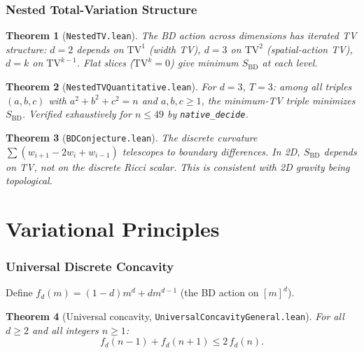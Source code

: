 \documentclass[11pt,a4paper]{article}
\newtheorem{theorem}{Theorem}[section]
\theoremstyle{remark}
\begin{document}
\section{Nested Total-Variation Structure}

\begin{theorem}[\texttt{NestedTV.lean}]
The BD action across dimensions has iterated TV structure:
$d = 2$ depends on $\mathrm{TV}^1$ (width TV),
$d = 3$ on $\mathrm{TV}^2$ (spatial-action TV),
$d = k$ on $\mathrm{TV}^{k-1}$.
Flat slices ($\mathrm{TV}^k = 0$) give minimum $S_{\mathrm{BD}}$ at each level.
\end{theorem}

\begin{theorem}[\texttt{NestedTVQuantitative.lean}]
For $d = 3$, $T = 3$: among all triples $(a,b,c)$ with $a^2+b^2+c^2 = n$
and $a,b,c \geq 1$, the minimum-TV triple minimizes $S_{\mathrm{BD}}$.
Verified exhaustively for $n \leq 49$ by \texttt{native\_decide}.
\end{theorem}

\begin{theorem}[\texttt{BDConjecture.lean}]
The discrete curvature $\sum(w_{i+1} - 2w_i + w_{i-1})$ telescopes to
boundary differences. In 2D, $S_{\mathrm{BD}}$ depends on TV, not on the
discrete Ricci scalar. This is consistent with 2D gravity being topological.
\end{theorem}

\part{Variational Principles}

\section{Universal Discrete Concavity}\label{sec:concavity}

Define $f_d(m) = (1{-}d)m^d + dm^{d-1}$ (the BD action on $[m]^d$).

\begin{theorem}[Universal concavity, \texttt{UniversalConcavityGeneral.lean}]
\label{thm:concavity}
For all $d \geq 2$ and all integers $n \geq 1$:
\begin{equation}
  f_d(n-1) + f_d(n+1) \leq 2\,f_d(n).
\end{equation}
\end{theorem}
\end{document}
